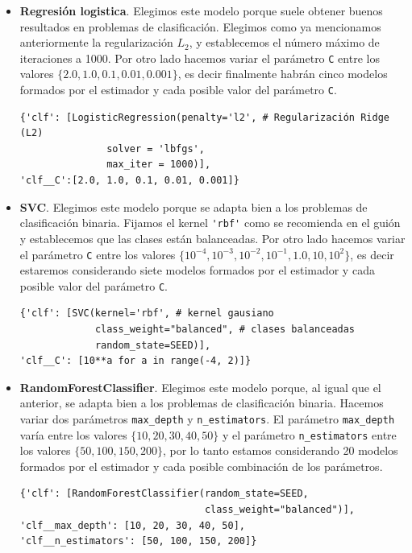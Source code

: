 \documentclass[size=a4, parskip=half, titlepage=false, toc=flat, toc=bib, 12pt]{scrartcl}
\begin{document}
\begin{itemize}
\item \textbf{Regresión logistica}. Elegimos este modelo porque suele obtener buenos resultados en problemas de clasificación. Elegimos como ya mencionamos anteriormente la regularización $L_2$, y establecemos el número máximo de iteraciones a 1000. Por otro lado hacemos variar el parámetro \verb|C| entre los valores $\{2.0, 1.0, 0.1 , 0.01, 0.001\}$, es decir finalmente habrán cinco modelos formados por el estimador y cada posible valor del parámetro \verb|C|.

\begin{verbatim}
{'clf': [LogisticRegression(penalty='l2', # Regularización Ridge (L2)
               solver = 'lbfgs',
               max_iter = 1000)],
'clf__C':[2.0, 1.0, 0.1, 0.01, 0.001]}
\end{verbatim}

\item \textbf{SVC}. Elegimos este modelo porque se adapta bien a los problemas de clasificación binaria. Fijamos el kernel \verb|'rbf'| como se recomienda en el guión y establecemos que las clases están balanceadas. Por otro lado hacemos variar el parámetro \verb|C| entre los valores $\{10^{-4},10^{-3},10^{-2},10^{-1},1.0,10,10^{2}\}$, es decir estaremos considerando siete modelos formados por el estimador y cada posible valor del parámetro \verb|C|.

\begin{verbatim}
{'clf': [SVC(kernel='rbf', # kernel gausiano
             class_weight="balanced", # clases balanceadas
             random_state=SEED)],
'clf__C': [10**a for a in range(-4, 2)]}
\end{verbatim}

\item \textbf{RandomForestClassifier}. Elegimos este modelo porque, al igual que el anterior, se adapta bien a los problemas de clasificación binaria. Hacemos variar dos parámetros \verb|max_depth| y \verb|n_estimators|. El parámetro \verb|max_depth| varía entre los valores $\{10,20,30,40,50\}$ y el parámetro \verb|n_estimators| entre los valores $\{50,100,150,200\}$, por lo tanto estamos considerando 20 modelos formados por el estimador y cada posible combinación de los parámetros.

\begin{verbatim}
{'clf': [RandomForestClassifier(random_state=SEED,
                                class_weight="balanced")],
'clf__max_depth': [10, 20, 30, 40, 50],
'clf__n_estimators': [50, 100, 150, 200]}
\end{verbatim}
\end{itemize}
\end{document}
